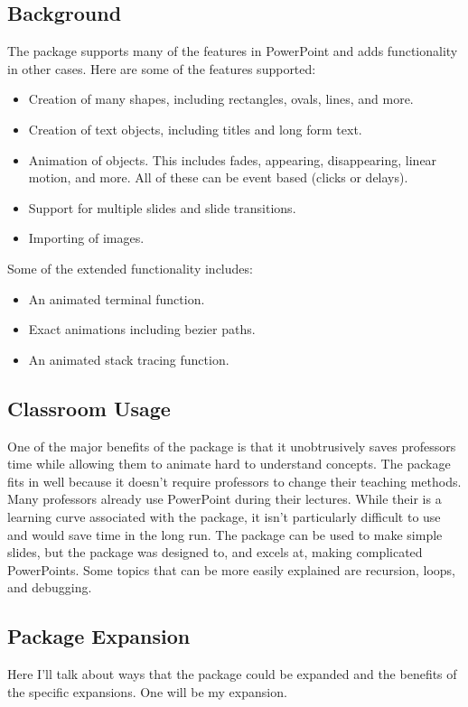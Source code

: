 \documentclass[12pt,twoside]{reedthesis}
\begin{document}
\subsection{Background}
The package supports many of the features in PowerPoint and adds functionality in other cases. Here are some of the features supported:
\begin{itemize}
\item Creation of many shapes, including rectangles, ovals, lines, and more. 
\item Creation of text objects, including titles and long form text. 
\item Animation of objects. This includes fades, appearing, disappearing, linear motion, and more. All of these can be event based (clicks or delays). 
\item Support for multiple slides and slide transitions.
\item Importing of images.
\end{itemize}
Some of the extended functionality includes:
\begin{itemize}
\item An animated terminal function.
\item Exact animations including bezier paths. 
\item An animated stack tracing function.
\end{itemize}

\subsection{Classroom Usage}
One of the major benefits of the package is that it unobtrusively saves professors time while allowing them to animate hard to understand concepts.  The package fits in well because it doesn't require professors to change their teaching methods. Many professors already use PowerPoint during their lectures. While their is a learning curve associated with the package, it isn't particularly difficult to use and would save time in the long run. The package can be used to make simple slides, but the package was designed to, and excels at, making complicated PowerPoints. Some topics that can be more easily explained are recursion, loops,  and debugging. 
	
\subsection{Package Expansion}
Here I'll talk about ways that the package could be expanded and the benefits of the specific expansions. One will be my expansion. 
\end{document}
